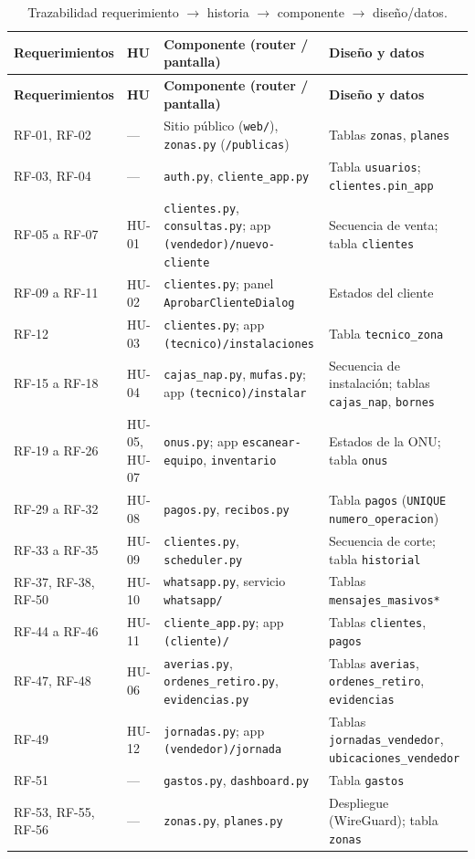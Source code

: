 {\small
\begin{longtable}{L{2.5cm}L{1.4cm}L{4.6cm}L{4.4cm}}
\caption{Trazabilidad requerimiento $\rightarrow$ historia $\rightarrow$ componente $\rightarrow$ diseño/datos.}
\label{tab:ce02-trazabilidad}\\
\toprule
\textbf{Requerimientos} & \textbf{HU} & \textbf{Componente (router / pantalla)} & \textbf{Diseño y datos} \\
\midrule
\endfirsthead
\toprule
\textbf{Requerimientos} & \textbf{HU} & \textbf{Componente (router / pantalla)} & \textbf{Diseño y datos} \\
\midrule
\endhead
\bottomrule
\endlastfoot
RF-01, RF-02 & --- & Sitio público (\texttt{web/}), \texttt{zonas.py} (\texttt{/publicas}) & Tablas \texttt{zonas}, \texttt{planes} \\
RF-03, RF-04 & --- & \texttt{auth.py}, \texttt{cliente\_app.py} & Tabla \texttt{usuarios}; \texttt{clientes.pin\_app} \\
RF-05 a RF-07 & HU-01 & \texttt{clientes.py}, \texttt{consultas.py}; app \texttt{(vendedor)/nuevo-cliente} & Secuencia de venta; tabla \texttt{clientes} \\
RF-09 a RF-11 & HU-02 & \texttt{clientes.py}; panel \texttt{AprobarClienteDialog} & Estados del cliente \\
RF-12 & HU-03 & \texttt{clientes.py}; app \texttt{(tecnico)/instalaciones} & Tabla \texttt{tecnico\_zona} \\
RF-15 a RF-18 & HU-04 & \texttt{cajas\_nap.py}, \texttt{mufas.py}; app \texttt{(tecnico)/instalar} & Secuencia de instalación; tablas \texttt{cajas\_nap}, \texttt{bornes} \\
RF-19 a RF-26 & HU-05, HU-07 & \texttt{onus.py}; app \texttt{escanear-equipo}, \texttt{inventario} & Estados de la ONU; tabla \texttt{onus} \\
RF-29 a RF-32 & HU-08 & \texttt{pagos.py}, \texttt{recibos.py} & Tabla \texttt{pagos} (\texttt{UNIQUE numero\_operacion}) \\
RF-33 a RF-35 & HU-09 & \texttt{clientes.py}, \texttt{scheduler.py} & Secuencia de corte; tabla \texttt{historial} \\
RF-37, RF-38, RF-50 & HU-10 & \texttt{whatsapp.py}, servicio \texttt{whatsapp/} & Tablas \texttt{mensajes\_masivos*} \\
RF-44 a RF-46 & HU-11 & \texttt{cliente\_app.py}; app \texttt{(cliente)/} & Tablas \texttt{clientes}, \texttt{pagos} \\
RF-47, RF-48 & HU-06 & \texttt{averias.py}, \texttt{ordenes\_retiro.py}, \texttt{evidencias.py} & Tablas \texttt{averias}, \texttt{ordenes\_retiro}, \texttt{evidencias} \\
RF-49 & HU-12 & \texttt{jornadas.py}; app \texttt{(vendedor)/jornada} & Tablas \texttt{jornadas\_vendedor}, \texttt{ubicaciones\_vendedor} \\
RF-51 & --- & \texttt{gastos.py}, \texttt{dashboard.py} & Tabla \texttt{gastos} \\
RF-53, RF-55, RF-56 & --- & \texttt{zonas.py}, \texttt{planes.py} & Despliegue (WireGuard); tabla \texttt{zonas} \\
\end{longtable}
}
